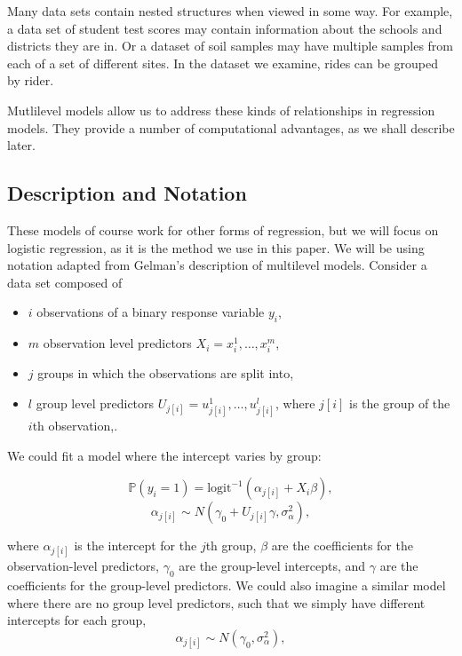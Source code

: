 \documentclass[12pt,twoside]{reedthesis}
\begin{document}
  Many data sets contain nested structures when viewed in some way. For
  example, a data set of student test scores may contain information about
  the schools and districts they are in. Or a dataset of soil samples may
  have multiple samples from each of a set of different sites. In the
  dataset we examine, rides can be grouped by rider.
  
  Mutlilevel models allow us to address these kinds of relationships in
  regression models. They provide a number of computational advantages, as
  we shall describe later.
  
  \subsection{Description and Notation}\label{description-and-notation}
  
  These models of course work for other forms of regression, but we will
  focus on logistic regression, as it is the method we use in this paper.
  We will be using notation adapted from Gelman's description of
  multilevel models. Consider a data set composed of
  
  \begin{itemize}
  \itemsep1pt\parskip0pt
  \item
    \(i\) observations of a binary response variable \(y_i\),
  \item
    \(m\) observation level predictors \(X_i = x_i^1, \ldots, x_i^m\),
  \item
    \(j\) groups in which the observations are split into,
  \item
    \(l\) group level predictors
    \(U_{j[i]} = u_{j[i]}^1, \ldots, u_{j[i]}^l\), where \(j[i]\) is the
    group of the \(i\)th observation,.
  \end{itemize}
  
  We could fit a model where the intercept varies by group:
  
  \[\mathbb{P} (y_i = 1) = \text{logit}^{-1}
  (\alpha_{j[i]} + X_i \beta),\]
  \[\alpha_{j[i]} \sim N(\gamma_0 + U_{j[i]} \gamma, \sigma_{\alpha}^2),\]
  
  where \(\alpha_{j[i]}\) is the intercept for the \(j\)th group,
  \(\beta\) are the coefficients for the observation-level predictors,
  \(\gamma_0\) are the group-level intercepts, and \(\gamma\) are the
  coefficients for the group-level predictors. We could also imagine a
  similar model where there are no group level predictors, such that we
  simply have different intercepts for each group,
  \[\alpha_{j[i]} \sim N(\gamma_0, \sigma_{\alpha}^2),\]
  
\end{document}
